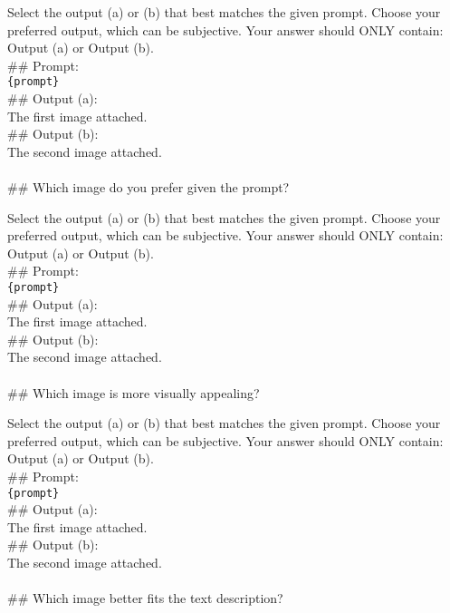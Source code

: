 \begin{tcolorbox}[colback=black!5, colframe=black, title= GPT-4o Evaluation Prompt for Q1: General Preference]
Select the output (a) or (b) that best matches the given prompt. Choose your preferred output, which can be subjective. Your answer should ONLY contain: Output (a) or Output (b).
\\

\#\# Prompt:\\
\texttt{\{prompt\}}
\\

\#\# Output (a):\\
The first image attached.
\\

\#\# Output (b):\\
The second image attached.
\\
\\

\#\# Which image do you prefer given the prompt?
\end{tcolorbox}

\begin{tcolorbox}[colback=black!5, colframe=black, title= GPT-4o Evaluation Prompt for Q2: Visual Appeal]
Select the output (a) or (b) that best matches the given prompt. Choose your preferred output, which can be subjective. Your answer should ONLY contain: Output (a) or Output (b).
\\

\#\# Prompt:\\
\texttt{\{prompt\}}
\\

\#\# Output (a):\\
The first image attached.
\\

\#\# Output (b):\\
The second image attached.
\\
\\

\#\# Which image is more visually appealing?
\end{tcolorbox}


\begin{tcolorbox}[colback=black!5, colframe=black, title= GPT-4o Evaluation Prompt for Q3: Prompt Alignment]
Select the output (a) or (b) that best matches the given prompt. Choose your preferred output, which can be subjective. Your answer should ONLY contain: Output (a) or Output (b).
\\

\#\# Prompt:\\
\texttt{\{prompt\}}
\\

\#\# Output (a):\\
The first image attached.
\\

\#\# Output (b):\\
The second image attached.
\\
\\

\#\# Which image better fits the text description?
\end{tcolorbox}

